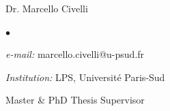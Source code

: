 \documentclass[margin,line]{res}
\newenvironment{list1}{
  \begin{list}{\ding{113}}{%
      \setlength{\itemsep}{0in}
      \setlength{\parsep}{0in} \setlength{\parskip}{0in}
      \setlength{\topsep}{0in} \setlength{\partopsep}{0in}
      \setlength{\leftmargin}{0.17in}}}{\end{list}}
\newenvironment{list2}{
  \begin{list}{$\bullet$}{%
      \setlength{\itemsep}{0in}
      \setlength{\parsep}{0in} \setlength{\parskip}{0in}
      \setlength{\topsep}{0in} \setlength{\partopsep}{0in}
      \setlength{\leftmargin}{0.2in}}}{\end{list}}
\begin{document}
\begin{resume}
\begin{list1}
  \item[] Dr. Marcello Civelli
  \begin{list2}
   \item {\it e-mail:} marcello.civelli@u-psud.fr
   \item {\it Institution:} LPS, Université Paris-Sud
   \item Master \& PhD Thesis Supervisor
  \end{list2}
\end{list1}



%



\end{resume}
\end{document}

